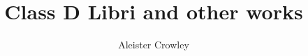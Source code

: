 \documentclass[paper=a5, fontsize=11pt, headings=openany, listof=totoc, pagesize=auto]{scrbook}
\begin{document}
\title{Class D Libri and other works}
\author{
  Aleister Crowley
}
\date{}

\frontmatter
\maketitle

\tableofcontents

\mainmatter
{}










\begin{Facing}





\end{Facing}














\end{document}
